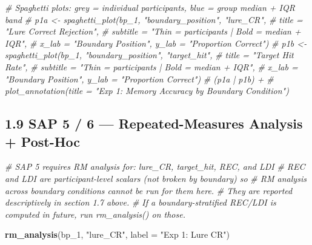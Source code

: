 \documentclass[
]{article}
\newenvironment{Shaded}{\begin{snugshade}}{\end{snugshade}}
\newcommand{\AttributeTok}[1]{\textcolor[rgb]{0.13,0.29,0.53}{#1}}
\newcommand{\CommentTok}[1]{\textcolor[rgb]{0.56,0.35,0.01}{\textit{#1}}}
\newcommand{\FunctionTok}[1]{\textcolor[rgb]{0.13,0.29,0.53}{\textbf{#1}}}
\newcommand{\NormalTok}[1]{#1}
\newcommand{\StringTok}[1]{\textcolor[rgb]{0.31,0.60,0.02}{#1}}
\begin{document}
\begin{Shaded}
\begin{Highlighting}[]
\CommentTok{\# Spaghetti plots: grey = individual participants, blue = group median + IQR band}
\CommentTok{\# p1a \textless{}{-} spaghetti\_plot(bp\_1, "boundary\_position", "lure\_CR",}
\CommentTok{\#                      title    = "Lure Correct Rejection",}
\CommentTok{\#                      subtitle = "Thin = participants | Bold = median + IQR",}
\CommentTok{\#                      x\_lab = "Boundary Position", y\_lab = "Proportion Correct")}
\CommentTok{\# p1b \textless{}{-} spaghetti\_plot(bp\_1, "boundary\_position", "target\_hit",}
\CommentTok{\#                     title    = "Target Hit Rate",}
\CommentTok{\#                      subtitle = "Thin = participants | Bold = median + IQR",}
\CommentTok{\#                      x\_lab = "Boundary Position", y\_lab = "Proportion Correct")}
\CommentTok{\# (p1a | p1b) +}
\CommentTok{\#  plot\_annotation(title = "Exp 1: Memory Accuracy by Boundary Condition")}
\end{Highlighting}
\end{Shaded}

\subsection{1.9 SAP 5 / 6 --- Repeated-Measures Analysis +
Post-Hoc}\label{sap-5-6-repeated-measures-analysis-post-hoc}

\begin{Shaded}
\begin{Highlighting}[]
\CommentTok{\# SAP 5 requires RM analysis for: lure\_CR, target\_hit, REC, and LDI}
\CommentTok{\# REC and LDI are participant{-}level scalars (not broken by boundary) so}
\CommentTok{\# RM analysis across boundary conditions cannot be run for them here.}
\CommentTok{\# They are reported descriptively in section 1.7 above.}
\CommentTok{\# If a boundary{-}stratified REC/LDI is computed in future, run rm\_analysis() on those.}

\FunctionTok{rm\_analysis}\NormalTok{(bp\_1, }\StringTok{"lure\_CR"}\NormalTok{,    }\AttributeTok{label =} \StringTok{"Exp 1: Lure CR"}\NormalTok{)}
\end{Highlighting}
\end{Shaded}
\end{document}
